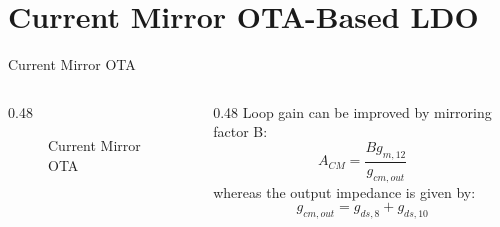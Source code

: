 \documentclass[10pt, aspectratio=169]{beamer}
\newcommand{\svg}[3]{
    \begin{figure}
        \centering
        
        \caption{#2}
    \end{figure}
}
\begin{document}
\section{Current Mirror OTA-Based LDO}
\begin{frame}{Current Mirror OTA}
    \begin{columns}[c,onlytextwidth]
        \begin{column}{0.48\textwidth}
            \svg{../images/cm_ota.svg}{Current Mirror OTA}{1}
        \end{column}
        \begin{column}{0.48\textwidth}
            Loop gain can be improved by mirroring factor B:
            \begin{equation*}
                A_{CM} = \frac{B g_{m,12}}{g_{cm,out}}
            \end{equation*}
            whereas the output impedance is given by:
            \begin{equation*}
                g_{cm,out} = g_{ds,8} + g_{ds,10}
            \end{equation*}
        \end{column}
    \end{columns}
\end{frame}
\end{document}
